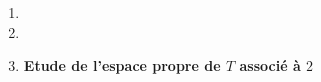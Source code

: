 \begin{enumerate}
      \item
            
      \item
            
      \item \textbf{Etude de l’espace propre de $T$ associé à $2$}
            
\end{enumerate}
